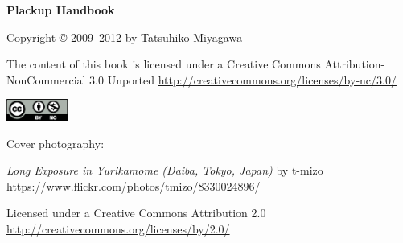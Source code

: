 \thispagestyle{empty}
\null
\vfill
\begin{center}
  \small
  \textbf{Plackup Handbook}

  \bigskip
  
  Copyright \copyright{} 2009--2012 by Tatsuhiko Miyagawa

  \bigskip

  The content of this book is licensed under a Creative Commons Attribution-NonCommercial 3.0 Unported 
  \url{http://creativecommons.org/licenses/by-nc/3.0/}

  \medskip

  \includegraphics[width=2cm]{images/cc-by-nc}

  \bigskip

  Cover photography:
  
  \textit{Long Exposure in Yurikamome (Daiba, Tokyo, Japan)} by t-mizo
  \url{https://www.flickr.com/photos/tmizo/8330024896/}
 
  Licensed under a Creative Commons Attribution 2.0
  \url{http://creativecommons.org/licenses/by/2.0/}

 
\end{center}



